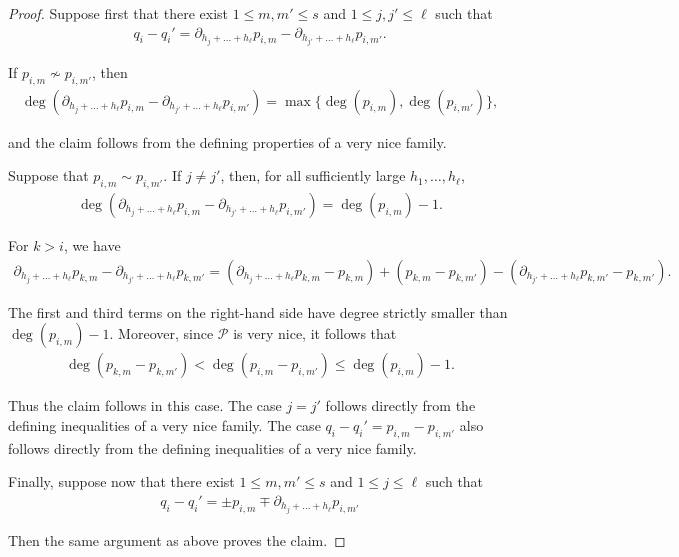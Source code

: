 \documentclass[11pt,reqno]{amsart}
\newcommand{\cP}{{\mathcal P}}
\theoremstyle{definition}
\theoremstyle{remark}
\begin{document}
\begin{proof}
Suppose first that there exist $1\leq m,m' \leq s$ and $1\leq j,j' \leq \ell$ such that\begin{align*}
    q_i - q_i' = \partial_{h_j+\dots+h_{\ell}}p_{i,m} - \partial_{h_{j'}+\dots+h_{\ell}}p_{i,m'}.
\end{align*}


If $p_{i,m}\not\sim p_{i,m'}$, then\begin{align*}
    \deg(\partial_{h_{j}+\dots+h_{\ell}}p_{i,m} -\partial_{h_{j'}+\dots+h_{\ell}}p_{i,m'}) = \max\{\deg(p_{i,m}),\deg(p_{i,m'})\},
\end{align*}

and the claim follows from the defining properties of a very nice family.

Suppose that $p_{i,m}\sim p_{i,m'}$. If $j\neq j'$, then, for all sufficiently large $h_1,\ldots,h_\ell$,\begin{align*}
    \deg(\partial_{h_{j}+\dots+h_\ell}p_{i,m} -\partial_{h_{j'}+\dots+h_\ell}p_{i,m'}) = \deg(p_{i,m})-1.
\end{align*}

For $k>i$, we have\begin{align*}
    \partial_{h_{j}+\dots+h_{\ell}}p_{k,m}-\partial_{h_{j'}+\dots+h_{\ell}}p_{k,m'} =(\partial_{h_{j}+\dots+h_{\ell}}p_{k,m}-p_{k,m})+(p_{k,m}-p_{k,m'}) -(\partial_{h_{j'}+\dots+h_{\ell}}p_{k,m'}-p_{k,m'}).
\end{align*}

The first and third terms on the right-hand side have degree strictly smaller than $\deg(p_{i,m})-1$. Moreover, since $\cP$ is very nice, it follows that \begin{align*}
    \deg(p_{k,m}-p_{k,m'}) < \deg(p_{i,m}-p_{i,m'})\leq \deg(p_{i,m})-1.
\end{align*}

Thus the claim follows in this case. The case $j=j'$ follows directly from the defining inequalities of a very nice family. The case $q_i-q_i' = p_{i,m}-p_{i,m'}$ also follows directly from the defining inequalities of a very nice family.

Finally, suppose now that there exist $1\leq m,m' \leq s$ and $1\leq j \leq \ell$ such that\begin{align*}
    q_i - q_i' = \pm p_{i,m} \mp \partial_{h_j+\dots+h_{\ell}}p_{i,m'}
\end{align*}

Then the same argument as above proves the claim.


\end{proof}
\end{document}
